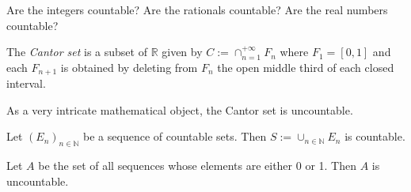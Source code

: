 \begin{exc}
  Are the integers countable?
  Are the rationals countable?
  Are the real numbers countable?
\end{exc}

\begin{defn}
  \label{def:CantorSet}
  The \emph{Cantor set} is a subset of $\mathbb{R}$
  given by $C:=\cap_{n=1}^{+\infty} F_n$
  where $F_1=[0,1]$
  and each $F_{n+1}$ is obtained
  by deleting from $F_n$ the open middle third
  of each closed interval. %
\end{defn}

\begin{rem}
  As a very intricate mathematical object, 
  the Cantor set is uncountable.
\end{rem}

\begin{thm}
  \label{thm:coutableSequenceUnion}
  Let $(E_n)_{n\in\mathbb{N}}$ be a sequence of countable sets.
  Then $S:=\cup_{n\in\mathbb{N}}E_n$ is countable.
\end{thm}

\begin{thm}
  \label{thm:uncountableSequenceOf0and1}
  Let $A$ be the set of all sequences whose elements
  are either 0 or 1.
  Then $A$ is uncountable. 
\end{thm}


